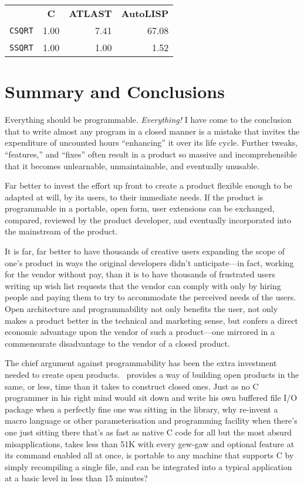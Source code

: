\documentclass[twocolumn]{article}
\begin{document}
\begin{center}
\begin{tabular}{lrrr}
 & \multicolumn{1}{c}{{\bf C}} &
   \multicolumn{1}{c}{{\bf ATLAST}} &
   \multicolumn{1}{c}{{\bf AutoLISP}} \\
{\tt CSQRT} & 1.00 & 7.41 & 67.08 \\
{\tt SSQRT} & 1.00 & 1.00 & 1.52  \\
\end{tabular}
\end{center}

\section{Summary and Conclusions}

Everything should be programmable.  {\em Everything!}  I have come to
the conclusion that to write almost any program in a closed manner is a
mistake that invites the expenditure of uncounted hours ``enhancing''
it over its life cycle.  Further tweaks, ``features,'' and ``fixes''
often result in a product so massive and incomprehensible that it becomes
unlearnable, unmaintainable, and eventually unusable.

Far better to invest the effort up front to create a product
flexible enough to be adapted at will, by its users, to their
immediate needs.  If the product is programmable in a portable, open
form, user extensions can be exchanged, compared, reviewed by the
product developer, and eventually incorporated into the mainstream of
the product.

It is far, far better to have thousands of creative users expanding
the scope of one's product in ways the original developers didn't
anticipate---in fact, working for the vendor without pay, than it is
to have thousands of frustrated users writing up wish list requests
that the vendor can comply with only by hiring people and paying them
to try to accommodate the perceived needs of the users.  Open
architecture and programmability not only benefits the user,
not only makes a product better in the technical and marketing sense,
but confers a direct economic advantage upon the vendor of such a
product---one mirrored in a commensurate disadvantage to the vendor
of a closed product.

The chief argument against programmability has been the extra
investment needed to create open products.  \atlast\ provides a way
of building open products in the same, or less, time than it takes to
construct closed ones.  Just as no C programmer in his right mind
would sit down and write his own buffered file I/O package when a
perfectly fine one was sitting in the library, why re-invent a macro
language or other parameterisation and programming facility when
there's one just sitting there that's as fast as native C code for all
but the most absurd misapplications, takes less than 51K with every
gew-gaw and optional feature at its command enabled all at once, is
portable to any machine that supports C by simply recompiling a single
file, and can be integrated into a typical application at a basic level
in less than 15 minutes?
\end{document}
